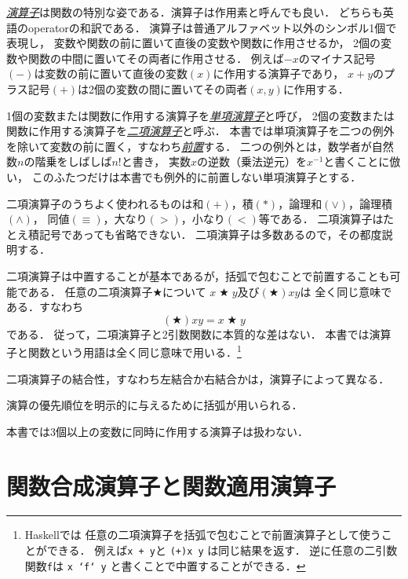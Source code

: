 \documentclass[a5paper,draft]{jsbook}
\newcommand{\programminglanguage}[1]{\textsf{#1}}
\newcommand{\haskell}{\programminglanguage{Haskell}}
\newcommand{\keyword}[1]{{\underline{\emph{#1}}}}
\newcommand{\code}[1]{\texttt{#1}}
\newcommand{\mathAnyBinaryOperator}{\mathbin{\bigstar}}
\begin{document}
\keyword{演算子}は関数の特別な姿である．演算子は作用素と呼んでも良い．
どちらも英語のoperatorの和訳である．
演算子は普通アルファベット以外のシンボル1個で表現し，
変数や関数の前に置いて直後の変数や関数に作用させるか，
2個の変数や関数の中間に置いてその両者に作用させる．
例えば$-x$のマイナス記号$(-)$は変数の前に置いて直後の変数$(x)$に作用する演算子であり，
$x+y$のプラス記号$(+)$は2個の変数の間に置いてその両者$\left(x,y\right)$に作用する．

1個の変数または関数に作用する演算子を\keyword{単項演算子}と呼び，
2個の変数または関数に作用する演算子を\keyword{二項演算子}と呼ぶ．
本書では単項演算子を二つの例外を除いて変数の前に置く，すなわち\keyword{前置}する．
二つの例外とは，数学者が自然数$n$の階乗をしばしば$n!$と書き，
実数$x$の逆数（乗法逆元）を$x^{-1}$と書くことに倣い，
このふたつだけは本書でも例外的に前置しない単項演算子とする．

二項演算子のうちよく使われるものは和$(+)$，積$(*)$，論理和$(\vee)$，論理積$(\wedge)$，
同値$(\equiv)$，大なり$(>)$，小なり$(<)$等である．
二項演算子はたとえ積記号であっても省略できない．
二項演算子は多数あるので，その都度説明する．

二項演算子は中置することが基本であるが，括弧で包むことで前置することも可能である．
任意の二項演算子$\mathAnyBinaryOperator$について
$x\mathAnyBinaryOperator y$及び$\left(\mathAnyBinaryOperator\right)xy$は
全く同じ意味である．すなわち
\begin{equation}
\left(\mathAnyBinaryOperator\right)xy=x\mathAnyBinaryOperator y
\end{equation}
である．
従って，二項演算子と2引数関数に本質的な差はない．
本書では演算子と関数という用語は全く同じ意味で用いる．\footnote{\haskell では
任意の二項演算子を括弧で包むことで前置演算子として使うことができる．
例えば\code{x + y}と \code{(+)x y} は同じ結果を返す．
逆に任意の二引数関数\code{f}は \code{x `f` y} と書くことで中置することができる．}

二項演算子の結合性，すなわち左結合か右結合かは，演算子によって異なる．

演算の優先順位を明示的に与えるために括弧が用いられる．

本書では3個以上の変数に同時に作用する演算子は扱わない．

\section{関数合成演算子と関数適用演算子}
\end{document}
